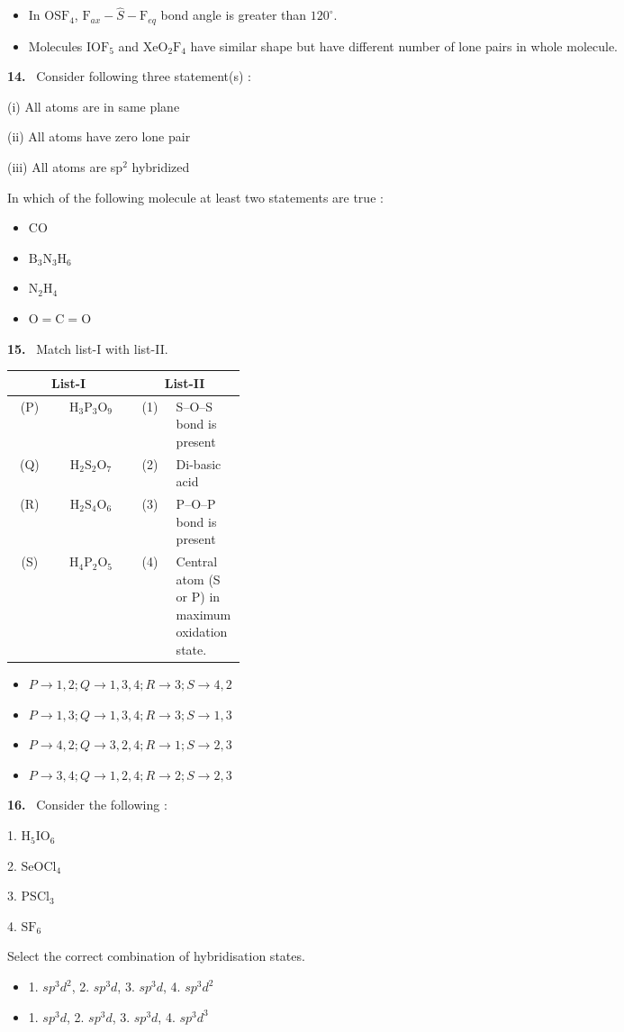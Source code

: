 \documentclass[10pt]{extarticle}
\newcommand{\qn}[1]{\par\smallskip\noindent\textbf{#1.}~}
\newenvironment{qoptions}{\begin{itemize}[leftmargin=1.8em,itemsep=1pt,topsep=2pt,label={}]}{\end{itemize}}
\newcommand{\opt}[2]{\item[(#1)] #2}
\begin{document}
\begin{multicols}{2}
\begin{qoptions}
\opt{C}{In $\mathrm{OSF_4}$, $\mathrm F_{ax}-\hat S-\mathrm F_{eq}$ bond angle is greater than $120^\circ$.}
\opt{D}{Molecules $\mathrm{IOF_5}$ and $\mathrm{XeO_2F_4}$ have similar shape but have different number of lone pairs in whole molecule.}
\end{qoptions}
\qn{14} Consider following three statement(s) :\par
(i) All atoms are in same plane\par
(ii) All atoms have zero lone pair\par
(iii) All atoms are sp$^2$ hybridized\par
In which of the following molecule at least two statements are true :
\begin{qoptions}
\opt{A}{CO}
\opt{B}{$\mathrm{B_3N_3H_6}$}
\opt{C}{$\mathrm{N_2H_4}$}
\opt{D}{$\mathrm{O=C=O}$}
\end{qoptions}
\qn{15} Match list-I with list-II.\par
{\footnotesize\setlength{\tabcolsep}{2pt}\begin{tabular}{|c|c|c|p{0.3\linewidth}|}
\hline
\multicolumn{2}{|c|}{\textbf{List-I}} & \multicolumn{2}{c|}{\textbf{List-II}}\\ \hline
(P) & $\mathrm{H_3P_3O_9}$ & (1) & S--O--S bond is present\\ \hline
(Q) & $\mathrm{H_2S_2O_7}$ & (2) & Di-basic acid\\ \hline
(R) & $\mathrm{H_2S_4O_6}$ & (3) & P--O--P bond is present\\ \hline
(S) & $\mathrm{H_4P_2O_5}$ & (4) & Central atom (S or P) in maximum oxidation state.\\ \hline
\end{tabular}}\par
\begin{qoptions}
\opt{A}{$P\to1,2;Q\to1,3,4;R\to3;S\to4,2$}
\opt{B}{$P\to1,3;Q\to1,3,4;R\to3;S\to1,3$}
\opt{C}{$P\to4,2;Q\to3,2,4;R\to1;S\to2,3$}
\opt{D}{$P\to3,4;Q\to1,2,4;R\to2;S\to2,3$}
\end{qoptions}
\qn{16} Consider the following :\par
1. $\mathrm{H_5IO_6}$\par
2. $\mathrm{SeOCl_4}$\par
3. $\mathrm{PSCl_3}$\par
4. $\mathrm{SF_6}$\par
Select the correct combination of hybridisation states.
\begin{qoptions}
\opt{A}{1. $sp^3d^2$, 2. $sp^3d$, 3. $sp^3d$, 4. $sp^3d^2$}
\opt{B}{1. $sp^3d$, 2. $sp^3d$, 3. $sp^3d$, 4. $sp^3d^3$}

\end{qoptions}
\end{multicols}
\end{document}
